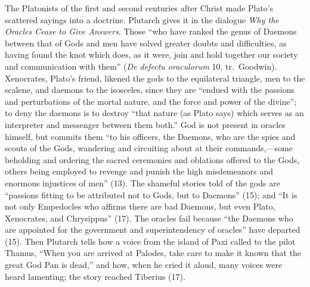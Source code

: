 The Platonists of the first and second centuries after Christ made
Plato's scattered sayings into a doctrine. Plutarch gives it in the
dialogue \emph{Why the Oracles Cease to Give Answers}.
Those ``who have ranked the genus of Daemons between that of Gods and
men have solved greater doubts and difficulties, as having found the
knot which does, as it were, join and hold together our society and
communication with them'' (\emph{De defectu oraculorum} 10, tr.\
Goodwin). Xenocrates, Plato's friend, likened the gods to the
equilateral triangle, men to the scalene, and daemons to the isosceles,
since they are ``endued with the passions and perturbations of the
mortal nature, and the force and power of the divine''; to deny the
daemons is to destroy ``that nature (as Plato says) which serves as an
interpreter and messenger between them both.'' God is not present in
oracles himself, but commits them ``to his officers, the Daemons, who
are the spies and scouts of the Gods, wandering and circuiting about at
their commands,---some beholding and ordering the sacred ceremonies and
oblations offered to the Gods, others being employed to revenge and
punish the high misdemeanors and enormous injustices of men'' (13). The
shameful stories told of the gods are ``passions fitting to be attributed not to
Gods, but to Daemons'' (15); and ``It is not only Empedocles who affirms
there are bad Daemons, but even Plato, Xenocrates, and Chrysippus''
(17). The oracles fail because ``the Daemons who are appointed for the
government and superintendency of oracles'' have departed (15). Then
Plutarch tells how a voice from the island of Paxi called to the pilot
Thamus, ``When you are arrived at Palodes, take care to make it known
that the great God Pan is dead,'' and how, when he cried it aloud,
many voices were heard lamenting; the story reached Tiberius (17).

